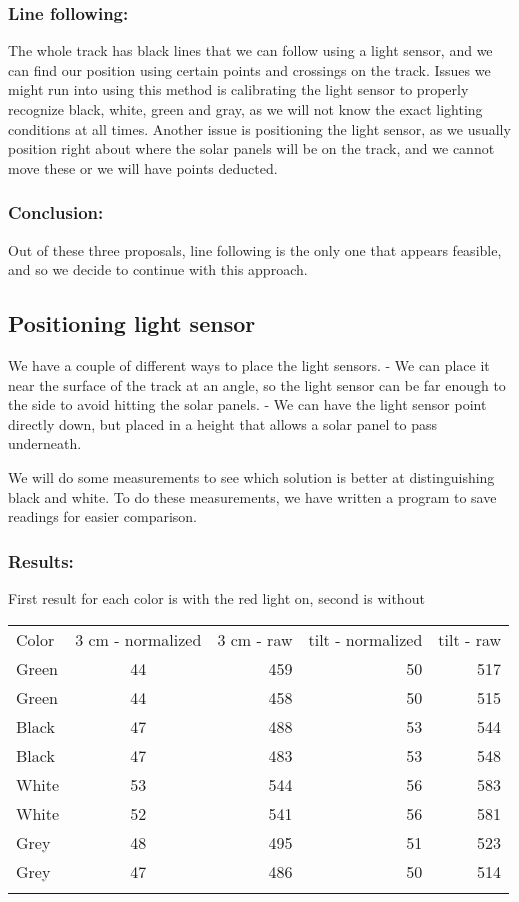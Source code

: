 \subsubsection{Line following:}
The whole track has black lines that we can
follow using a light sensor, and we can find our position using certain
points and crossings on the track.
Issues we might run into using this
method is calibrating the light sensor to properly recognize black,
white, green and gray, as we will not know the exact lighting conditions
at all times. Another issue is positioning the light sensor, as we
usually position right about where the solar panels will be on the
track, and we cannot move these or we will have points deducted.

\subsubsection{Conclusion:}
Out of these three proposals, line following is
the only one that appears feasible, and so we decide to continue with
this approach.

\subsection{Positioning light sensor}

We have a couple of different ways to place the light sensors. - We can
place it near the surface of the track at an angle, so the light sensor
can be far enough to the side to avoid hitting the solar panels. - We
can have the light sensor point directly down, but placed in a height
that allows a solar panel to pass underneath.

We will do some measurements to see which solution is better at
distinguishing black and white. To do these measurements, we have
written a program to save readings for easier comparison.

\subsubsection{Results:}
First result for each
color is with the red light on, second is without

\begin{longtable}[c]{@{}lcrrr@{}}
\hline\noalign{\medskip}
Color & 3 cm - normalized & 3 cm - raw & tilt - normalized & tilt - raw
\\\noalign{\medskip}
\hline\noalign{\medskip}
Green & 44 & 459 & 50 & 517
\\\noalign{\medskip}
Green & 44 & 458 & 50 & 515
\\\noalign{\medskip}
Black & 47 & 488 & 53 & 544
\\\noalign{\medskip}
Black & 47 & 483 & 53 & 548
\\\noalign{\medskip}
White & 53 & 544 & 56 & 583
\\\noalign{\medskip}
White & 52 & 541 & 56 & 581
\\\noalign{\medskip}
Grey & 48 & 495 & 51 & 523
\\\noalign{\medskip}
Grey & 47 & 486 & 50 & 514
\\\noalign{\medskip}
\hline
\end{longtable}

